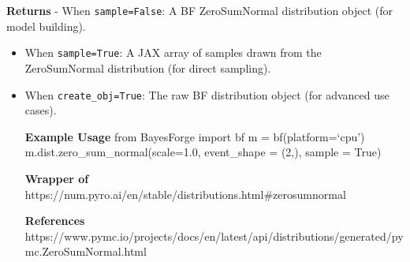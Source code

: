\documentclass[
  letterpaper,
  DIV=11,
  numbers=noendperiod]{scrartcl}
\begin{document}
\textbf{Returns} - When \texttt{sample=False}: A BF ZeroSumNormal
distribution object (for model building).

\begin{itemize}
\item
  When \texttt{sample=True}: A JAX array of samples drawn from the
  ZeroSumNormal distribution (for direct sampling).
\item
  When \texttt{create\_obj=True}: The raw BF distribution object (for
  advanced use cases).

  \textbf{Example Usage} from BayesForge import bf m =
  bf(platform=`cpu') m.dist.zero\_sum\_normal(scale=1.0, event\_shape =
  (2,), sample = True)

  \textbf{Wrapper of}
  https://num.pyro.ai/en/stable/distributions.html\#zerosumnormal

  \textbf{References}
  https://www.pymc.io/projects/docs/en/latest/api/distributions/generated/pymc.ZeroSumNormal.html
\end{itemize}
\end{document}
